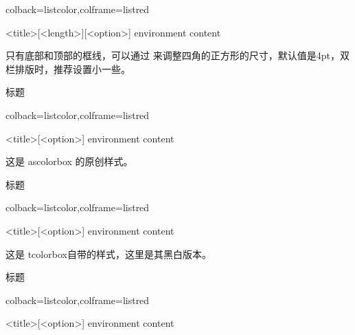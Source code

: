 \documentclass[fontset=none]{ctexart}
\begin{document}
	
	\begin{dispListing*}{colback=listcolor,colframe=listred}
		\begin{ascolorbox11}[<subtitle>]{<title>}[<length>][<option>]
			environment content
		\end{ascolorbox11}
	\end{dispListing*}
	
	只有底部和顶部的框线，可以通过  来调整四角的正方形的尺寸，默认值是4pt，双栏排版时，推荐设置小一些。
	
	\begin{dispExample}
		\begin{ascolorbox11}[子标题]{标题}
			\zhlipsum[1]
		\end{ascolorbox11}
	\end{dispExample}
	
	
	
	\begin{dispListing*}{colback=listcolor,colframe=listred}
		\begin{ascolorbox12}[<subtitle>]{<title>}[<option>]
			environment content
		\end{ascolorbox12}
	\end{dispListing*}
	
	这是 ascolorbox 的原创样式。
	
	\begin{dispExample}
		\begin{ascolorbox12}[子标题]{标题}
			\zhlipsum[1]
		\end{ascolorbox12}
	\end{dispExample}
	
	
	\begin{dispListing*}{colback=listcolor,colframe=listred}
		\begin{ascolorbox13}[<subtitle>]{<title>}[<option>]
			environment content
		\end{ascolorbox13}
	\end{dispListing*}
	
	这是 tcolorbox自带的样式，这里是其黑白版本。
	
	\begin{dispExample}
		\begin{ascolorbox13}[子标题]{标题}
			\zhlipsum[1]
		\end{ascolorbox13}
	\end{dispExample}
	
	
	
	\begin{dispListing*}{colback=listcolor,colframe=listred}
		\begin{ascolorbox14}{<title>}[<option>]
			environment content
		\end{ascolorbox14}
	\end{dispListing*}
	
\end{document}
